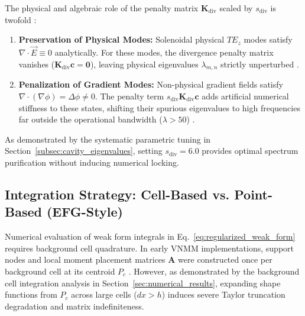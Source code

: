 \documentclass[preprint,12pt]{elsarticle}
\begin{document}
The physical and algebraic role of the penalty matrix $\mathbf{K}_{\mathrm{div}}$ scaled by $s_{\mathrm{div}}$ is twofold \cite{monk2003finite, bossavit1990spurious}:
\begin{enumerate}
    \item \textbf{Preservation of Physical Modes:} Solenoidal physical $TE_z$ modes satisfy $\nabla \cdot \vec{E} \equiv 0$ analytically. For these modes, the divergence penalty matrix vanishes ($\mathbf{K}_{\mathrm{div}} \mathbf{c} = \mathbf{0}$), leaving physical eigenvalues $\lambda_{m,n}$ strictly unperturbed \cite{monk2003finite, jin2014finite}.
    \item \textbf{Penalization of Gradient Modes:} Non-physical gradient fields satisfy $\nabla \cdot (\nabla \phi) = \Delta \phi \neq 0$. The penalty term $s_{\mathrm{div}} \mathbf{K}_{\mathrm{div}} \mathbf{c}$ adds artificial numerical stiffness to these states, shifting their spurious eigenvalues to high frequencies far outside the operational bandwidth ($\lambda > 50$) \cite{monk2003finite, bossavit1990spurious, boffi1999computational}.
\end{enumerate}
As demonstrated by the systematic parametric tuning in Section~\ref{subsec:cavity_eigenvalues}, setting $s_{\mathrm{div}} = 6.0$ provides optimal spectrum purification without inducing numerical locking.



\subsection{Integration Strategy: Cell-Based vs. Point-Based (EFG-Style)}
\label{subsec:integration_strategy}

Numerical evaluation of weak form integrals in Eq.~\eqref{eq:regularized_weak_form} requires background cell quadrature. In early VNMM implementations, support nodes and local moment placement matrices $\mathbf{A}$ were constructed once per background cell at its centroid $P_c$ \cite{ortiz2021nodal, ortiz2023tese}. However, as demonstrated by the background cell integration analysis in Section~\ref{sec:numerical_results}, expanding shape functions from $P_c$ across large cells ($dx > h$) induces severe Taylor truncation degradation and matrix indefiniteness.
\end{document}
